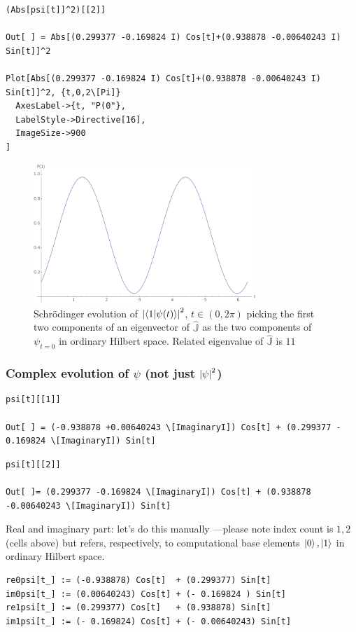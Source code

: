 \begin{Verbatim}
(Abs[psi[t]]^2)[[2]]

Out[ ] = Abs[(0.299377 -0.169824 I) Cos[t]+(0.938878 -0.00640243 I) Sin[t]]^2
  
Plot[Abs[(0.299377 -0.169824 I) Cos[t]+(0.938878 -0.00640243 I) Sin[t]]^2, {t,0,2\[Pi]}
  AxesLabel->{t, "P(0"},
  LabelStyle->Directive[16],
  ImageSize->900
]
\end{Verbatim}
\begin{figure}[!h]
  \centering
  \includegraphics[width=0.75\textwidth]{img/probB_1.png}
  \caption[(from notebook)]{
    Schr{\"o}dinger evolution of
    $\qty|\braket{1}{\psi(t)}|^2$, $t \in (0, 2\pi) $
    picking the first two components of an eigenvector of $\hat{\mathbb{J}}$
    as the two components of $\psi_{t=0}$ in ordinary Hilbert space.
    Related eigenvalue of $\hat{\mathbb{J}}$ is $11$
  }
\end{figure}

\subsubsection{Complex evolution of $\psi$ (not just $\qty|\psi|^2$)}
\begin{Verbatim}
psi[t][[1]]

Out[ ] = (-0.938878 +0.00640243 \[ImaginaryI]) Cos[t] + (0.299377 - 0.169824 \[ImaginaryI]) Sin[t]
\end{Verbatim}
\begin{Verbatim}
psi[t][[2]]

Out[ ]= (0.299377 -0.169824 \[ImaginaryI]) Cos[t] + (0.938878 -0.00640243 \[ImaginaryI]) Sin[t]
\end{Verbatim}  
Real and imaginary part: let's do this manually ---please note index count is
$1, 2$ (cells above)
but refers, respectively, to computational base elements
$\ket{0}, \ket{1}$ in ordinary Hilbert space.
\begin{Verbatim}
re0psi[t_] := (-0.938878) Cos[t]  + (0.299377) Sin[t]
im0psi[t_] := (0.00640243) Cos[t] + (- 0.169824 ) Sin[t]
re1psi[t_] := (0.299377) Cos[t]   + (0.938878) Sin[t]
im1psi[t_] := (- 0.169824) Cos[t] + (- 0.00640243) Sin[t] 
\end{Verbatim}

